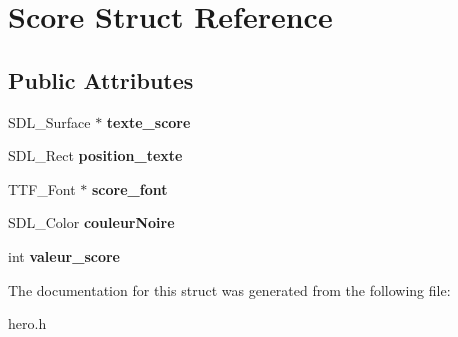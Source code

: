 \hypertarget{structScore}{}\section{Score Struct Reference}
\label{structScore}
\subsection*{Public Attributes}
\begin{DoxyCompactItemize}
\item 
\mbox{\label{structScore_ad9bae0529c9c744abdd0b1860b9731d2}} 
S\+D\+L\+\_\+\+Surface $\ast$ {\bfseries texte\+\_\+score}
\item 
\mbox{\label{structScore_ac5b7d95ca27a0c9527b1a3897c4a19d6}} 
S\+D\+L\+\_\+\+Rect {\bfseries position\+\_\+texte}
\item 
\mbox{\label{structScore_a1d2d12c67fabfeb656b6660995d3d856}} 
T\+T\+F\+\_\+\+Font $\ast$ {\bfseries score\+\_\+font}
\item 
\mbox{\label{structScore_a35b649d464a12207405d63b52a4afa58}} 
S\+D\+L\+\_\+\+Color {\bfseries couleur\+Noire}
\item 
\mbox{\label{structScore_a9188e7325c612cb5ece7a0f6c818089a}} 
int {\bfseries valeur\+\_\+score}
\end{DoxyCompactItemize}


The documentation for this struct was generated from the following file\+:\begin{DoxyCompactItemize}
\item 
hero.\+h\end{DoxyCompactItemize}
